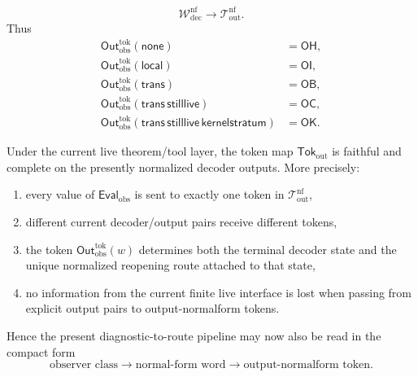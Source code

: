 \begin{definition}
\[\mathcal W^{\mathrm{nf}}_{\mathrm{dec}}
\longrightarrow
\mathcal T^{\mathrm{nf}}_{\mathrm{out}}.
\]
Thus
\begin{align*}
\mathsf{Out}^{\mathrm{tok}}_{\mathrm{obs}}(\mathsf{none})&=\mathsf{OH},\\
\mathsf{Out}^{\mathrm{tok}}_{\mathrm{obs}}(\mathsf{local})&=\mathsf{OI},\\
\mathsf{Out}^{\mathrm{tok}}_{\mathrm{obs}}(\mathsf{trans})&=\mathsf{OB},\\
\mathsf{Out}^{\mathrm{tok}}_{\mathrm{obs}}(\mathsf{trans}\,\mathsf{stilllive})&=\mathsf{OC},\\
\mathsf{Out}^{\mathrm{tok}}_{\mathrm{obs}}(\mathsf{trans}\,\mathsf{stilllive}\,\mathsf{kernelstratum})&=\mathsf{OK}.
\end{align*}
\end{definition}

\begin{proposition}
\label{prop:output-normalform-tokens-faithful-complete-current-deterministic-decoder-results}
Under the current live theorem/tool layer, the token map \(\mathsf{Tok}_{\mathrm{out}}\) is faithful and complete on the presently normalized decoder outputs. More precisely:
\begin{enumerate}[label=(\roman*)]
 \item every value of \(\mathsf{Eval}_{\mathrm{obs}}\) is sent to exactly one token in \(\mathcal T^{\mathrm{nf}}_{\mathrm{out}}\),
 \item different current decoder/output pairs receive different tokens,
 \item the token \(\mathsf{Out}^{\mathrm{tok}}_{\mathrm{obs}}(w)\) determines both the terminal decoder state and the unique normalized reopening route attached to that state,
 \item no information from the current finite live interface is lost when passing from explicit output pairs to output-normalform tokens.
\end{enumerate}
Hence the present diagnostic-to-route pipeline may now also be read in the compact form
\[
\text{observer class}
\longrightarrow
\text{normal-form word}
\longrightarrow
\text{output-normalform token}.
\]
\end{proposition}

